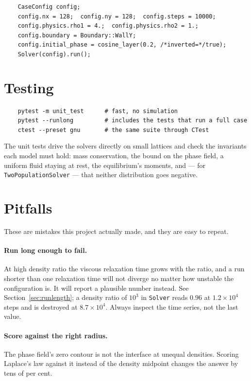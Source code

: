 \documentclass[11pt,a4paper]{article}
\theoremstyle{plain}
\theoremstyle{definition}
\begin{document}
\begin{verbatim}
    CaseConfig config;
    config.nx = 128;  config.ny = 128;  config.steps = 10000;
    config.physics.rho1 = 4.;  config.physics.rho2 = 1.;
    config.boundary = Boundary::WallY;
    config.initial_phase = cosine_layer(0.2, /*inverted=*/true);
    Solver(config).run();
\end{verbatim}

\section{Testing}

\begin{verbatim}
    pytest -m unit_test      # fast, no simulation
    pytest --runlong         # includes the tests that run a full case
    ctest --preset gnu       # the same suite through CTest
\end{verbatim}

The unit tests drive the solvers directly on small lattices and check the
invariants each model must hold: mass conservation, the bound on the phase
field, a uniform fluid staying at rest, the equilibrium's moments, and --- for
\texttt{TwoPopulationSolver} --- that neither distribution goes negative.

\section{Pitfalls}
\label{sec:pitfalls}

These are mistakes this project actually made, and they are easy to repeat.

\paragraph{Run long enough to fail.} At high density ratio the viscous
relaxation time grows with the ratio, and a run shorter than one relaxation
time will not diverge no matter how unstable the configuration is. It will
report a plausible number instead. See Section~\ref{sec:runlength}; a density
ratio of $10^3$ in \texttt{Solver} reads $0.96$ at $1.2\times10^4$ steps and is
destroyed at $8.7\times10^4$. Always inspect the time series, not the last
value.

\paragraph{Score against the right radius.} The phase field's zero contour is
not the interface at unequal densities. Scoring Laplace's law against it instead
of the density midpoint changes the answer by tens of per cent.
\end{document}
